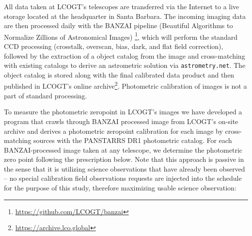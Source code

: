 \documentclass[]{spieman}
\begin{document}
All data taken at LCOGT's telescopes are transferred via the Internet to a live storage located at
the headquarter in Santa Barbara. The incoming imaging data are then processed daily with the BANZAI
pipeline (Beautiful Algorithms to Normalize Zillions of Astronomical Images)
\cite{mccully2018}\footnote{\url{https://github.com/LCOGT/banzai}}, which will perform the standard
CCD processing (crosstalk, overscan, bias, dark, and flat field correction), followed by the
extraction of a object catalog from the image and cross-matching with existing catalogs to derive an
astrometric solution via {\tt astrometry.net}\cite{lang2010}. The object catalog is stored along
with the final calibrated data product and then published in LCOGT's online
archive\footnote{\url{https://archive.lco.global}}. Photometric calibration of images is not a part
of standard processing.

To measure the photometric zeropoint in LCOGT's images we have developed a program that crawls
through BANZAI processed image from LCOGT's on-site archive and derives a photometric zeropoint
calibration for each image by cross-matching sources with the PANSTARRS DR1 photometric
catalog\cite{chambers2016}. For each BANZAI-processed image taken at any telescope, we determine the
photometric zero point following the prescription below. Note that this approach is passive in the
sense that it is utilizing science observations that have already been observed -- no special
calibration field observations requests are injected into the schedule for the purpose of this
study, therefore maximizing usable science observation:
\end{document}
